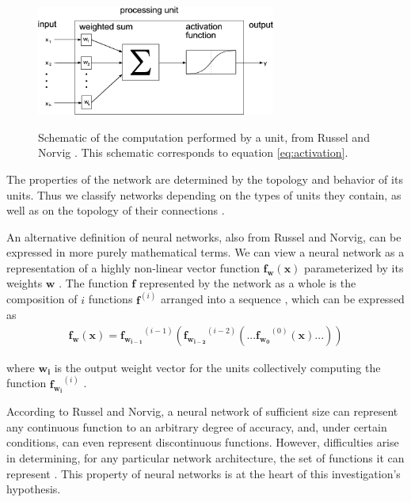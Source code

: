 \documentclass[12pt, titlepage]{report}
\theoremstyle{definition}
\begin{document}
\begin{figure}
\centering
\includegraphics[width=0.7\textwidth]{img/neuron.png}\\
\caption{Schematic of the computation performed by a unit, from Russel and Norvig \cite[p.728]{russel2009artificial}. This schematic corresponds to equation \ref{eq:activation}.}
\label{figure:neural_unit}
\end{figure}

The properties of the network are determined by the topology and behavior of its units. Thus we classify networks depending on the types of units they contain, as well as on the topology of their connections \cite[p. 729]{russel2009artificial}. 

An alternative definition of neural networks, also from Russel and Norvig, can be expressed in more purely mathematical terms. We can view a neural network as  a representation of a highly non-linear vector function $\bm{f}_{\bm{w}}(\bm{x})$ parameterized by its weights $\bm{w}$ \cite{russel2009artificial}. The function $\bm{f}$ represented by the network as a whole is the composition of $i$ functions $\bm{f}^(i)$ arranged into a sequence \cite{goodfellow2016deep}, which can be expressed as
 \begin{gather}\label{eq:neural_net_composition}
 \bm{f_w}(\bm{x}) = \bm{f_{w_{i - 1}}}^{(i - 1)}(\bm{f_{w_{i - 2}}}^{(i - 2)}(... \bm{f_{w_0}}^{(0)}(\bm{x}) ...))
\end{gather}

where $\bm{w_i}$ is the output weight vector for the units collectively computing the function $\bm{f_{w_i}}^{(i)}$ \cite{goodfellow2016deep}.

According to Russel and Norvig, a neural network of sufficient size can represent any continuous function to an arbitrary degree of accuracy, and, under certain conditions, can even represent discontinuous functions. However, difficulties arise in determining, for any particular network architecture, the set of functions it can represent \cite{russel2009artificial}. This property of neural networks is at the heart of this investigation's hypothesis.
\end{document}
